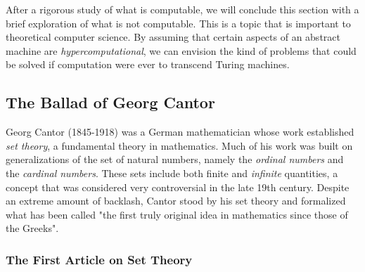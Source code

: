 After a rigorous study of what is computable, we will conclude this section with a brief exploration of what is not computable. This is a topic that is important to theoretical computer science. By assuming that certain aspects of an abstract machine are \textit{hypercomputational}, we can envision the kind of problems that could be solved if computation were ever to transcend Turing machines. \\


\subsection{The Ballad of Georg Cantor}

Georg Cantor (1845-1918) was a German mathematician whose work established \textit{set theory}, a fundamental theory in mathematics. Much of his work was built on generalizations of the set of natural numbers, namely the \textit{ordinal numbers} and the \textit{cardinal numbers}. These sets include both finite and \textit{infinite} quantities, a concept that was considered very controversial in the late 19th century. Despite an extreme amount of backlash, Cantor stood by his set theory and formalized what has been called "the first truly original idea in mathematics since those of the Greeks". \\

\subsubsection{The First Article on Set Theory}

